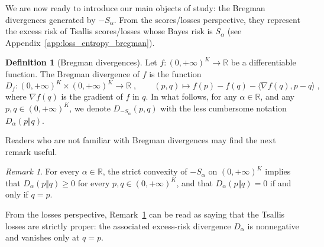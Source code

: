 \documentclass[11pt,oneside,a4paper]{article}
\newcommand{\R}{\mathbb{R}}
\theoremstyle{plain}
\theoremstyle{definition}
\newtheorem{definition}[theorem]{Definition}
\theoremstyle{remark}
\newtheorem{remark}[theorem]{Remark}
\begin{document}
We are now ready to introduce our main objects of study: the Bregman divergences generated by $-S_\alpha$.
From the scores/losses perspective, they represent the excess risk of Tsallis scores/losses whose Bayes risk is $S_\alpha$ (see Appendix~\ref{app:loss_entropy_bregman}).
\begin{definition}[Bregman divergences]\label{def:bregman}
Let $f \colon (0,+\infty)^K \to \R$ be a differentiable function.
The Bregman divergence of $f$ is the function
\[
    D_f \colon (0,+\infty)^K\times(0,+\infty)^K\to\R\;,
\qquad
    (p,q) \mapsto f(p)-f(q)- \langle \nabla f(q),p-q\rangle\;,
\]
where $\nabla f(q)$ is the gradient of $f$ in $q$. In what follows, for any $\alpha \in \R$, and any $p,q \in (0,+\infty)^K$, we denote $D_{-S_\alpha}(p,q)$ with the less cumbersome notation $D_\alpha(p \Vert q)$.
\end{definition}
Readers who are not familiar with Bregman divergences may find the next remark useful.
\begin{remark}\label{r:breg-strict-convexity}
For every $\alpha \in \R$, the strict convexity of $-S_{\alpha}$ on $(0,+\infty)^K$ implies that $D_\alpha(p\Vert q) \geq 0$ for every $p, q \in (0,+\infty)^K$, and that $D_\alpha(p\Vert q) = 0$ if and only if $q = p$.
\end{remark}
From the losses perspective, Remark~\ref{r:breg-strict-convexity}  can be read  as saying that the Tsallis losses are strictly proper: the associated excess-risk divergence $D_\alpha$ is nonnegative and vanishes only at $q=p$.
\end{document}
